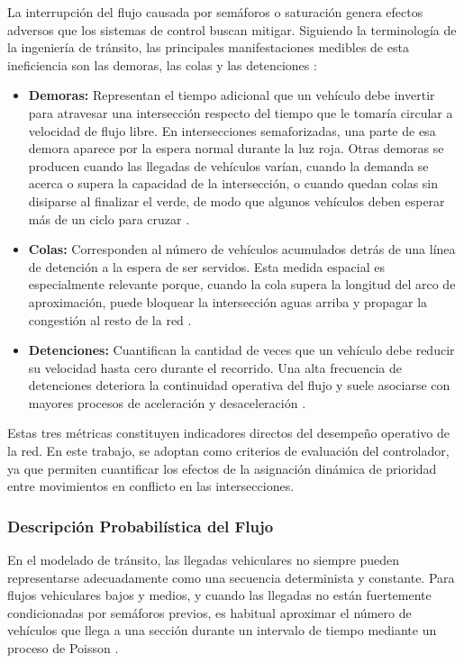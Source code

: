 La interrupción del flujo causada por semáforos o saturación genera efectos adversos que los sistemas de control buscan mitigar. Siguiendo la terminología de la ingeniería de tránsito, las principales manifestaciones medibles de esta ineficiencia son las demoras, las colas y las detenciones \cite[Cap.~1, Sec.~1.1]{fernandez}:
\begin{itemize}
    \item \textbf{Demoras:} Representan el tiempo adicional que un vehículo debe invertir para atravesar una intersección respecto del tiempo que le tomaría circular a velocidad de flujo libre. En intersecciones semaforizadas, una parte de esa demora aparece por la espera normal durante la luz roja. Otras demoras se producen cuando las llegadas de vehículos varían, cuando la demanda se acerca o supera la capacidad de la intersección, o cuando quedan colas sin disiparse al finalizar el verde, de modo que algunos vehículos deben esperar más de un ciclo para cruzar \cite[Cap.~1, Sec.~1.1]{fernandez}.
    \item \textbf{Colas:} Corresponden al número de vehículos acumulados detrás de una línea de detención a la espera de ser servidos. Esta medida espacial es especialmente relevante porque, cuando la cola supera la longitud del arco de aproximación, puede bloquear la intersección aguas arriba y propagar la congestión al resto de la red \cite[Cap.~1, Sec.~1.1]{fernandez}.
    \item \textbf{Detenciones:} Cuantifican la cantidad de veces que un vehículo debe reducir su velocidad hasta cero durante el recorrido. Una alta frecuencia de detenciones deteriora la continuidad operativa del flujo y suele asociarse con mayores procesos de aceleración y desaceleración \cite[Cap.~1, Sec.~1.1]{fernandez}.
\end{itemize}

Estas tres métricas constituyen indicadores directos del desempeño operativo de la red. En este trabajo, se adoptan como criterios de evaluación del controlador, ya que permiten cuantificar los efectos de la asignación dinámica de prioridad entre movimientos en conflicto en las intersecciones.

\subsubsection{Descripción Probabilística del Flujo}

En el modelado de tránsito, las llegadas vehiculares no siempre pueden representarse adecuadamente como una secuencia determinista y constante. Para flujos vehiculares bajos y medios, y cuando las llegadas no están fuertemente condicionadas por semáforos previos, es habitual aproximar el número de vehículos que llega a una sección durante un intervalo de tiempo mediante un proceso de Poisson \cite[p.~342]{calymayor}.

